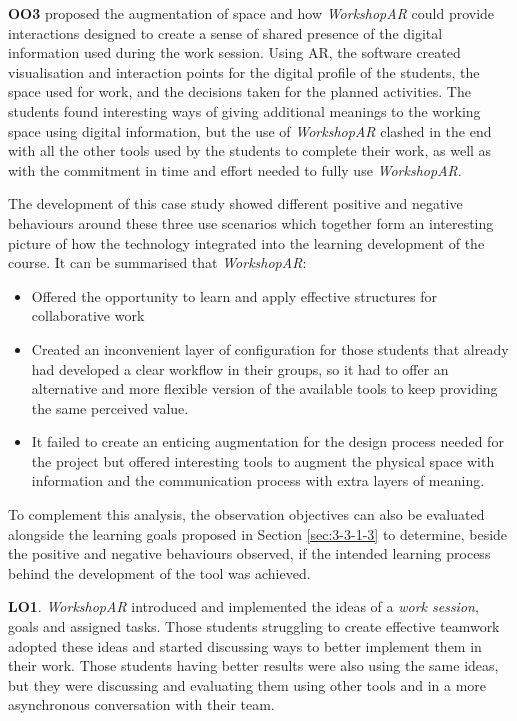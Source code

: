 \textbf{OO3} proposed the augmentation of space and how \emph{WorkshopAR} could provide interactions designed to create a sense of shared presence of the digital information
used during the work session. Using \ac{AR}, the software created visualisation and interaction points for the digital profile of the students, the space used for work,
and the decisions taken for the planned activities. The students found interesting ways of giving additional meanings to the working space using digital information, but
the use of \emph{WorkshopAR} clashed in the end with all the other tools used by the students to complete their work, as well as with the commitment in time and effort
needed to fully use \emph{WorkshopAR}.

The development of this case study showed different positive and negative behaviours around these three use scenarios which together form an interesting picture of how
the technology integrated into the learning development of the course. It can be summarised that \emph{WorkshopAR}:

\begin{itemize}
    \item Offered the opportunity to learn and apply effective structures for collaborative work
    \item Created an inconvenient layer of configuration for those students that already had developed a clear workflow in their groups, so it had to offer an alternative
    and more flexible version of the available tools to keep providing the same perceived value.
    \item It failed to create an enticing augmentation for the design process needed for the project but offered interesting tools to augment the physical space with
    information and the communication process with extra layers of meaning.
\end{itemize}

To complement this analysis, the observation objectives can also be evaluated alongside the learning goals proposed in Section \ref{sec:3-3-1-3} to determine, beside the
positive and negative behaviours observed, if the intended learning process behind the development of the tool was achieved.

\textbf{LO1}. \emph{WorkshopAR} introduced and implemented the ideas of a \emph{work session}, goals and assigned tasks. Those students struggling to create effective
teamwork adopted these ideas and started discussing ways to better implement them in their work. Those students having better results were also using the same ideas, but
they were discussing and evaluating them using other tools and in a more asynchronous conversation with their team.


